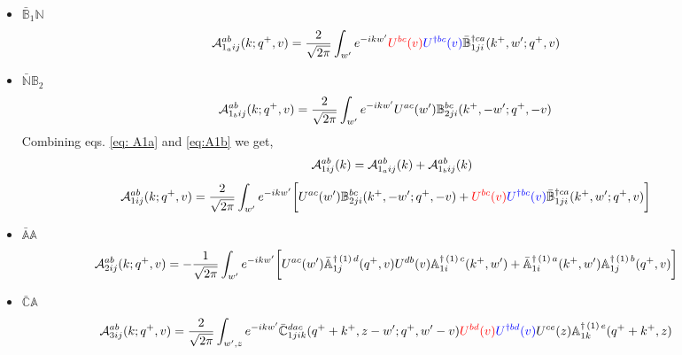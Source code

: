 \documentclass[10pt]{article}
\def\mf#1{\mathbb{#1}}
\numberwithin{equation}{section}
\begin{document}
\begin{itemize}
\item $\bar{\mf{B}}_{1} \mf{N}$
\begin{align}\label{eq: A1a}
    {\cal A}^{ab}_{1_{a}ij}(k; q^{+},v) & = \frac{2}{\sqrt{2\pi}}\int_{w^{\prime}}e^{-i k w^\prime} \textcolor{red}{U^{bc}(v)}\textcolor{blue}{U^{\dagger bc}(v)}\Bar{\mf{B}}^{\dagger ca}_{1ji}(k^{+},w^{\prime};q^{+},v)
\end{align}
 \item $\bar{{\mf{N}}}\mf{B}_{2}$
\begin{align} \label{eq:A1b}
        {\cal A}^{ab}_{1_{b}ij}(k; q^{+},v) & = \frac{2}{\sqrt{2\pi}}  \int_{w^{\prime}}e^{-i k w^\prime}U^{ac}(w^{\prime}) \mf{B}^{bc}_{2ji}(k^{+},-w^{\prime};q^{+},-v)
    \end{align}
Combining eqs. \eqref{eq: A1a} and \eqref{eq:A1b} we get,
$${\cal A}^{ab}_{1ij}(k) = {\cal A}^{ab}_{1_{a}ij}(k) + {\cal A}^{ab}_{1_{b}ij}(k)$$
\begin{align}
     {\cal A}^{ab}_{1ij}(k; q^{+},v) & = \frac{2}{\sqrt{2\pi}} \int_{w^{\prime}}e^{-i k w^\prime}\bigg[U^{ac}(w^{\prime}) \mf{B}^{bc}_{2ji}(k^{+},-w^{\prime};q^{+},-v)+\textcolor{red}{U^{bc}(v)}\textcolor{blue}{U^{\dagger bc}(v)}\Bar{\mf{B}}^{\dagger ca}_{1ji}(k^{+},w^{\prime};q^{+},v)\bigg]
\end{align}
   \item $\bar{{\mf{A}}} \mf{A}$
\begin{align} 
     {\cal A}^{ab}_{2ij}(k; q^{+},v) & = -\frac{1}{\sqrt{2\pi}} \int_{w^{\prime}} e^{-ikw^{\prime}}\bigg[U^{ac}(w^{\prime}) \Bar{\mf{A}}^{\dagger\,(1)\, d}_{1j}(q^{+},v)U^{ db}(v) \mf{A}^{\dagger\,(1)\, c}_{1i}(k^{+},w^{\prime})+\Bar{\mf{A}}^{\dagger\,(1)\, a}_{1i}(k^{+},w^{\prime}) \mf{A}^{\dagger\,(1)\, b}_{1j}(q^{+},v)\bigg] 
\end{align}
\item $\bar{{\mf{C}}} \mf{A}$
    \begin{align}
         {\cal A}^{ab}_{3ij}(k; q^{+},v) & = \frac{2}{\sqrt{2\pi}}  \int_{w^{\prime},z} e^{-i k w^\prime}\Bar{\mf{C}}^{dac}_{1jik}(q^{+}+k^{+},z-w^{\prime}; q^{+},w^{\prime}-v)\textcolor{red}{U^{bd}(v)}\textcolor{blue}{U^{\dagger bd}(v)}U^{ce}(z) \mf{A}^{\dagger\,(1)\,e}_{1k}(q^{+}+k^{+},z)
    \end{align}
\end{itemize}
\end{document}
